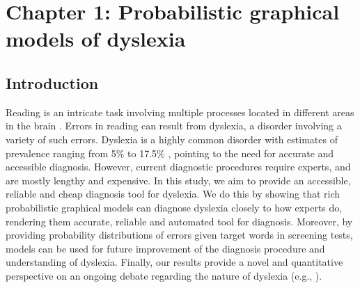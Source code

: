 
\chapter{Chapter 1: Probabilistic graphical models of dyslexia}
\section{Introduction}
Reading is an intricate task involving multiple processes located in different areas in the brain \citep{price2012review}. Errors in reading can result from dyslexia, a disorder involving a variety of such errors. Dyslexia is a highly common disorder with estimates of prevalence ranging from 5\% to 17.5\% \citep{ss05}, pointing to the need for accurate and accessible diagnosis. However, current diagnostic procedures require experts, and are mostly lengthy and expensive. In this study, we aim to provide an accessible, reliable and cheap diagnosis tool for dyslexia. We do this by showing that rich probabilistic graphical models can diagnose dyslexia closely to how experts do, rendering them accurate, reliable and automated tool for diagnosis. Moreover, by providing probability distributions of errors given target words in screening tests, models can be used for future improvement of the diagnosis procedure and understanding of dyslexia. Finally, our results provide a novel and quantitative perspective on an ongoing debate regarding the nature of dyslexia (e.g., \citealp{eg14}).

